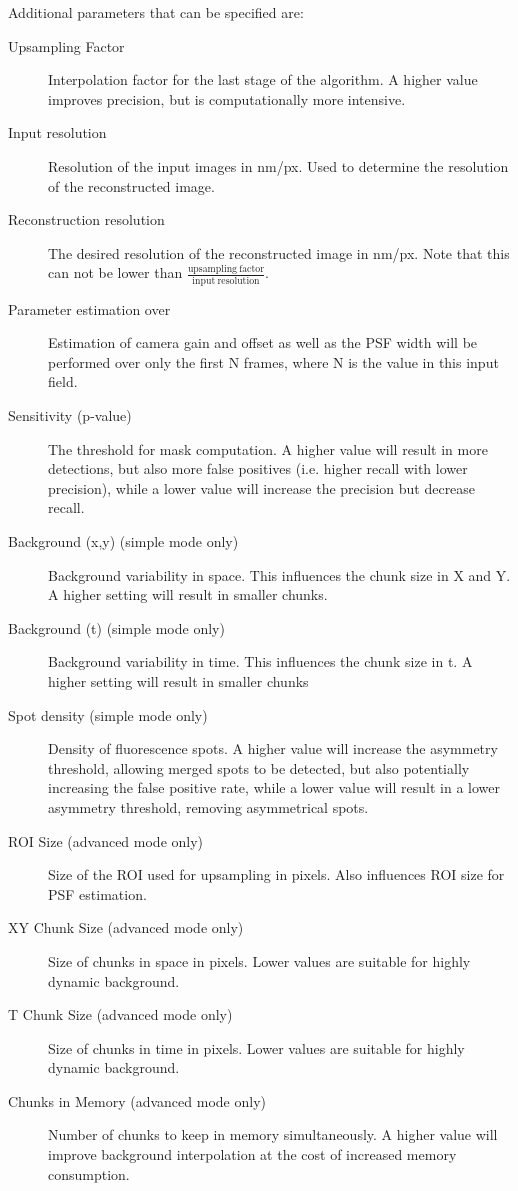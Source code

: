 \documentclass[a4paper,12pt,notitlepage]{report}
\begin{document}
Additional parameters that can be specified are:
\begin{description}
    \item[Upsampling Factor] Interpolation factor for the last stage of the algorithm. A higher value improves precision, but is computationally more intensive.
    \item[Input resolution] Resolution of the input images in nm/px. Used to determine the resolution of the reconstructed image.
    \item[Reconstruction resolution] The desired resolution of the reconstructed image in nm/px. Note that this can not be lower than $\mathrm{\frac{upsampling\ factor}{input\ resolution}}$.
    \item[Parameter estimation over] Estimation of camera gain and offset as well as the PSF width will be performed over only the first N frames, where N is the value in this input field.
    \item[Sensitivity (p-value)] The threshold for mask computation. A higher value will result in more detections, but also more false positives (i.e. higher recall with lower precision), while a lower value will increase the precision but decrease recall.
    \item[Background (x,y) (simple mode only)] Background variability in space. This influences the chunk size in X and Y. A higher setting will result in smaller chunks.
    \item[Background (t) (simple mode only)] Background variability in time. This influences the chunk size in t. A higher setting will result in smaller chunks
    \item[Spot density (simple mode only)] Density of fluorescence spots. A higher value will increase the asymmetry threshold, allowing merged spots to be detected, but also potentially increasing the false positive rate, while a lower value will result in a lower asymmetry threshold, removing asymmetrical spots.
    \item[ROI Size (advanced mode only)] Size of the ROI used for upsampling in pixels. Also influences ROI size for PSF estimation.
    \item[XY Chunk Size (advanced mode only)] Size of chunks in space in pixels. Lower values are suitable for highly dynamic background.
    \item[T Chunk Size (advanced mode only)] Size of chunks in time in pixels. Lower values are suitable for highly dynamic background.
    \item[Chunks in Memory (advanced mode only)] Number of chunks to keep in memory simultaneously. A higher value will improve background interpolation at the cost of increased memory consumption.

\end{description}
\end{document}
